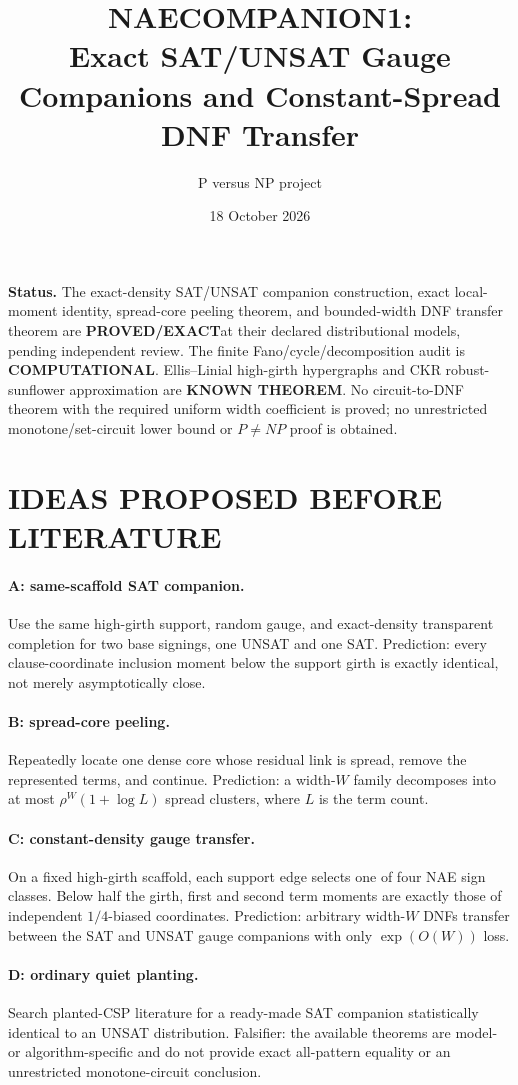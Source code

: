 \documentclass[11pt]{article}
\title{NAECOMPANION1:\\Exact SAT/UNSAT Gauge Companions and Constant-Spread DNF Transfer}
\author{P versus NP project}
\date{18 October 2026}
\newcommand{\EXACT}{\textbf{PROVED/EXACT}}
\newcommand{\KNOWN}{\textbf{KNOWN THEOREM}}
\newcommand{\COMP}{\textbf{COMPUTATIONAL}}
\begin{document}
\maketitle

\noindent\textbf{Status.}
The exact-density SAT/UNSAT companion construction, exact local-moment identity, spread-core peeling theorem, and bounded-width DNF transfer theorem are \EXACT at their declared distributional models, pending independent review. The finite Fano/cycle/decomposition audit is \COMP. Ellis--Linial high-girth hypergraphs and CKR robust-sunflower approximation are \KNOWN. No circuit-to-DNF theorem with the required uniform width coefficient is proved; no unrestricted monotone/set-circuit lower bound or $P\ne NP$ proof is obtained.

\section{IDEAS PROPOSED BEFORE LITERATURE}
\paragraph{A: same-scaffold SAT companion.}
Use the same high-girth support, random gauge, and exact-density transparent completion for two base signings, one UNSAT and one SAT. Prediction: every clause-coordinate inclusion moment below the support girth is exactly identical, not merely asymptotically close.

\paragraph{B: spread-core peeling.}
Repeatedly locate one dense core whose residual link is spread, remove the represented terms, and continue. Prediction: a width-$W$ family decomposes into at most $\rho^W(1+\log L)$ spread clusters, where $L$ is the term count.

\paragraph{C: constant-density gauge transfer.}
On a fixed high-girth scaffold, each support edge selects one of four NAE sign classes. Below half the girth, first and second term moments are exactly those of independent $1/4$-biased coordinates. Prediction: arbitrary width-$W$ DNFs transfer between the SAT and UNSAT gauge companions with only $\exp(O(W))$ loss.

\paragraph{D: ordinary quiet planting.}
Search planted-CSP literature for a ready-made SAT companion statistically identical to an UNSAT distribution. Falsifier: the available theorems are model- or algorithm-specific and do not provide exact all-pattern equality or an unrestricted monotone-circuit conclusion.
\end{document}
